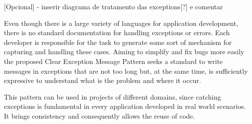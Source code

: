 \documentclass[12pt]{article}
\begin{document}
[Opcional] - inserir diagrama de tratamento das exceptions[?] e comentar

Even though there is a large variety of languages for application development, there is no standard documentation for handling exceptions or errors. Each developer is responsible for the task to generate some sort of mechanism for capturing and handling these cases. Aiming to simplify and fix bugs more easily the proposed Clear Exception Message Pattern seeks a standard to write messages in exceptions that are not too long but, at the same time, is sufficiently expressive  to understand what is the problem and where it occur.

This pattern can be used in projects of different domains, since catching exceptions is fundamental in every application developed in real world scenarios. It brings consistency and consequently allows the reuse of code.



\end{document}
